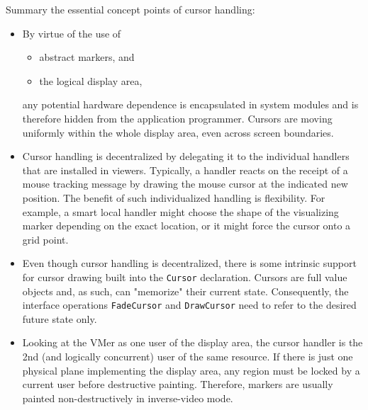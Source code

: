 Summary the essential concept points of cursor handling:
\begin{itemize}
  \item By virtue of the use of
    \begin{itemize}
      \item abstract markers, and
      \item the logical display area,
    \end{itemize}
    any potential hardware dependence is encapsulated in system modules
    and is therefore hidden from the application programmer.
    Cursors are moving uniformly within the whole display area,
    even across screen boundaries.

  \item Cursor handling is decentralized by delegating it to the individual handlers
    that are installed in viewers.  Typically, a handler reacts on the receipt
    of a mouse tracking message by drawing the mouse cursor at the indicated new position.
    The benefit of such individualized handling is flexibility.  For example,
    a smart local handler might choose the shape of the visualizing marker
    depending on the exact location, or it might force the cursor onto a grid point.

  \item Even though cursor handling is decentralized, there is some intrinsic support
    for cursor drawing built into the \verb|Cursor| declaration.
    Cursors are full value objects and, as such, can "memorize" their current state.
    Consequently, the interface operations \verb|FadeCursor| and \verb|DrawCursor|
    need to refer to the desired future state only.

  \item Looking at the VMer as one user of the display area, the cursor handler
    is the 2nd (and logically concurrent) user of the same resource.  If there is
    just one physical plane implementing the display area, any region must be locked
    by a current user before destructive painting.  Therefore,
    markers are usually painted non-destructively in inverse-video mode.
\end{itemize}

